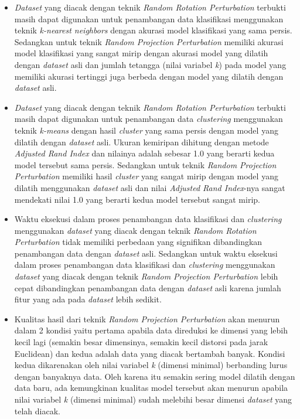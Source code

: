 \begin{itemize}
    \item \textit{Dataset} yang diacak dengan teknik \textit{Random Rotation Perturbation} terbukti masih dapat digunakan untuk penambangan data klasifikasi menggunakan teknik \textit{k-nearest neighbors} dengan akurasi model klasifikasi yang sama persis. Sedangkan untuk teknik \textit{Random Projection Perturbation} memiliki akurasi model klasifikasi yang sangat mirip dengan akurasi model yang dilatih dengan \textit{dataset} asli dan jumlah tetangga (nilai variabel \textit{k}) pada model yang memiliki akurasi tertinggi juga berbeda dengan model yang dilatih dengan \textit{dataset} asli.
    \item \textit{Dataset} yang diacak dengan teknik \textit{Random Rotation Perturbation} terbukti masih dapat digunakan untuk penambangan data \textit{clustering} menggunakan teknik \textit{k-means} dengan hasil \textit{cluster} yang sama persis dengan model yang dilatih dengan \textit{dataset} asli. Ukuran kemiripan dihitung dengan metode \textit{Adjusted Rand Index} dan nilainya adalah sebesar 1.0 yang berarti kedua model tersebut sama persis. Sedangkan untuk teknik \textit{Random Projection Perturbation} memiliki hasil \textit{cluster} yang sangat mirip dengan model yang dilatih menggunakan \textit{dataset} asli dan nilai \textit{Adjusted Rand Index}-nya sangat mendekati nilai 1.0 yang berarti kedua model tersebut sangat mirip.
    \item Waktu eksekusi dalam proses penambangan data klasifikasi dan \textit{clustering} menggunakan \textit{dataset} yang diacak dengan teknik \textit{Random Rotation Perturbation} tidak memiliki perbedaan yang signifikan dibandingkan penambangan data dengan \textit{dataset} asli. Sedangkan untuk waktu eksekusi dalam proses penambangan data klasifikasi dan \textit{clustering} menggunakan \textit{dataset} yang diacak dengan teknik \textit{Random Projection Perturbation} lebih cepat dibandingkan penambangan data dengan \textit{dataset} asli karena jumlah fitur yang ada pada \textit{dataset} lebih sedikit.
    \item Kualitas hasil dari teknik \textit{Random Projection Perturbation} akan menurun dalam 2 kondisi yaitu pertama apabila data direduksi ke dimensi yang lebih kecil lagi (semakin besar dimensinya, semakin kecil distorsi pada jarak Euclidean) dan kedua adalah data yang diacak bertambah banyak. Kondisi kedua dikarenakan oleh nilai variabel \textit{k} (dimensi minimal) berbanding lurus dengan banyaknya data. Oleh karena itu semakin sering model dilatih dengan data baru, ada kemungkinan kualitas model tersebut akan menurun apabila nilai variabel \textit{k} (dimensi minimal) sudah melebihi besar dimensi \textit{dataset} yang telah diacak.
\end{itemize}

